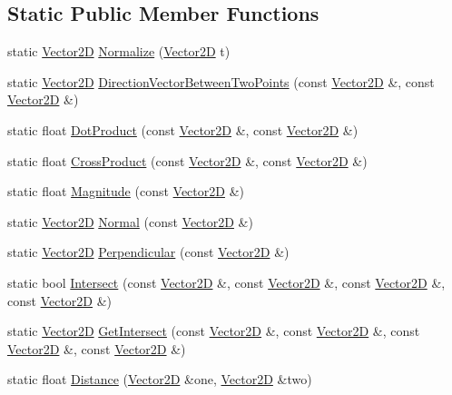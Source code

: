 \subsection*{Static Public Member Functions}
\begin{DoxyCompactItemize}
\item 
static \hyperlink{class_vector2_d}{Vector2D} \hyperlink{class_vector2_d_ae6670477c183fef0006d0af7f9b8ee09}{Normalize} (\hyperlink{class_vector2_d}{Vector2D} t)
\item 
static \hyperlink{class_vector2_d}{Vector2D} \hyperlink{class_vector2_d_a483b380a98091be25a4ac092eb42ee0f}{Direction\+Vector\+Between\+Two\+Points} (const \hyperlink{class_vector2_d}{Vector2D} \&, const \hyperlink{class_vector2_d}{Vector2D} \&)
\item 
static float \hyperlink{class_vector2_d_af901712cb8cb175c42eed90415cfd214}{Dot\+Product} (const \hyperlink{class_vector2_d}{Vector2D} \&, const \hyperlink{class_vector2_d}{Vector2D} \&)
\item 
static float \hyperlink{class_vector2_d_ad9557501f1291b4be24d940483754a4b}{Cross\+Product} (const \hyperlink{class_vector2_d}{Vector2D} \&, const \hyperlink{class_vector2_d}{Vector2D} \&)
\item 
static float \hyperlink{class_vector2_d_ab4ba105fdb95eed5a9bdd0137fe1ac13}{Magnitude} (const \hyperlink{class_vector2_d}{Vector2D} \&)
\item 
static \hyperlink{class_vector2_d}{Vector2D} \hyperlink{class_vector2_d_ac7936ba558378f5a558ca9954303e72c}{Normal} (const \hyperlink{class_vector2_d}{Vector2D} \&)
\item 
static \hyperlink{class_vector2_d}{Vector2D} \hyperlink{class_vector2_d_a283016b326b61db46c85ca1df8530d50}{Perpendicular} (const \hyperlink{class_vector2_d}{Vector2D} \&)
\item 
static bool \hyperlink{class_vector2_d_ae18bd72a2e20265772884cbf7a9bff94}{Intersect} (const \hyperlink{class_vector2_d}{Vector2D} \&, const \hyperlink{class_vector2_d}{Vector2D} \&, const \hyperlink{class_vector2_d}{Vector2D} \&, const \hyperlink{class_vector2_d}{Vector2D} \&)
\item 
static \hyperlink{class_vector2_d}{Vector2D} \hyperlink{class_vector2_d_a61b8609e60892e34d458559ec11d020a}{Get\+Intersect} (const \hyperlink{class_vector2_d}{Vector2D} \&, const \hyperlink{class_vector2_d}{Vector2D} \&, const \hyperlink{class_vector2_d}{Vector2D} \&, const \hyperlink{class_vector2_d}{Vector2D} \&)
\item 
static float \hyperlink{class_vector2_d_a93592066c13a15a9f244ebccc04134ec}{Distance} (\hyperlink{class_vector2_d}{Vector2D} \&one, \hyperlink{class_vector2_d}{Vector2D} \&two)

\end{DoxyCompactItemize}
